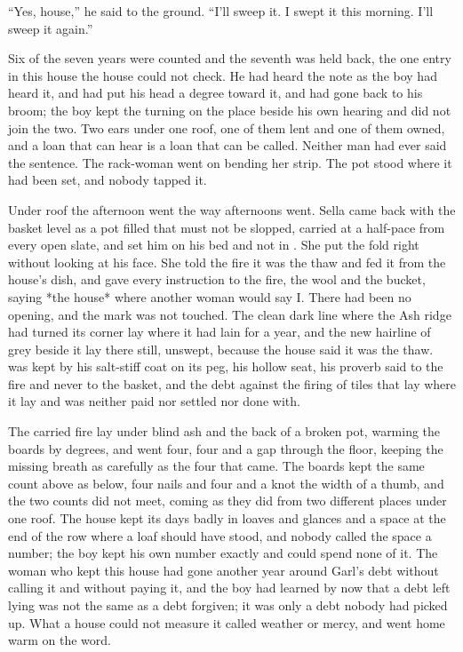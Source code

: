 “Yes, house,” he said to the ground. “I'll sweep it. I swept it this morning. I'll sweep it again.”

Six of the seven years were counted and the seventh was held back, the one entry in this house the house could not check. He had heard the note as the boy had heard it, and had put his head a degree toward it, and had gone back to his broom; the boy kept the turning on the place beside his own hearing and did not join the two. Two ears under one roof, one of them lent and one of them owned, and a loan that can hear is a loan that can be called. Neither man had ever said the sentence. The rack-woman went on bending her strip. The pot stood where it had been set, and nobody tapped it.

\scenebreak

Under  roof the afternoon went the way afternoons went. Sella came back with the basket level as a pot filled that must not be slopped, carried at a half-pace from every open slate, and set him on his bed and not in . She put the fold right without looking at his face. She told the fire it was the thaw and fed it from the house's dish, and gave every instruction to the fire, the wool and the bucket, saying *the house* where another woman would say I. There had been no opening, and the mark was not touched. The clean dark line where the Ash ridge had turned its corner lay where it had lain for a year, and the new hairline of grey beside it lay there still, unswept, because the house said it was the thaw.  was kept by his salt-stiff coat on its peg, his hollow seat, his proverb said to the fire and never to the basket, and the debt against the firing of tiles that lay where it lay and was neither paid nor settled nor done with.

The carried fire lay under blind ash and the back of a broken pot, warming the boards by degrees, and  went four, four and a gap through the floor, keeping the missing breath as carefully as the four that came. The boards kept the same count above as below, four nails and four and a knot the width of a thumb, and the two counts did not meet, coming as they did from two different places under one roof. The house kept its days badly in loaves and glances and a space at the end of the row where a loaf should have stood, and nobody called the space a number; the boy kept his own number exactly and could spend none of it. The woman who kept this house had gone another year around Garl's debt without calling it and without paying it, and the boy had learned by now that a debt left lying was not the same as a debt forgiven; it was only a debt nobody had picked up. What a house could not measure it called weather or mercy, and went home warm on the word.

